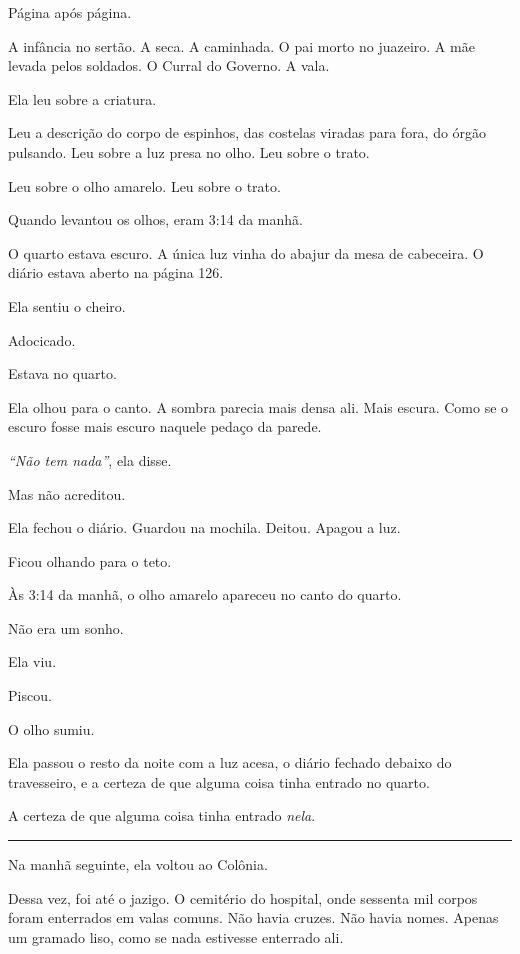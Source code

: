 \noindent Página após página.

\noindent A infância no sertão. A seca. A caminhada. O pai morto no juazeiro. A mãe levada pelos soldados. O Curral do Governo. A vala.

\noindent Ela leu sobre a criatura.

\noindent Leu a descrição do corpo de espinhos, das costelas viradas para fora, do órgão pulsando. Leu sobre a luz presa no olho. Leu sobre o trato.

\noindent Leu sobre o olho amarelo. Leu sobre o trato.

\noindent Quando levantou os olhos, eram 3:14 da manhã.

\noindent O quarto estava escuro. A única luz vinha do abajur da mesa de cabeceira. O diário estava aberto na página 126.

\noindent Ela sentiu o cheiro.

\noindent Adocicado.

\noindent Estava no quarto.

\noindent Ela olhou para o canto. A sombra parecia mais densa ali. Mais escura. Como se o escuro fosse mais escuro naquele pedaço da parede.

\noindent \textit{\textquotedblleft{}Não tem nada\textquotedblright{}}, ela disse.

\noindent Mas não acreditou.

\noindent Ela fechou o diário. Guardou na mochila. Deitou. Apagou a luz.

\noindent Ficou olhando para o teto.

\noindent Às 3:14 da manhã, o olho amarelo apareceu no canto do quarto.

\noindent Não era um sonho.

\noindent Ela viu.

\noindent Piscou.

\noindent O olho sumiu.

\noindent Ela passou o resto da noite com a luz acesa, o diário fechado debaixo do travesseiro, e a certeza de que alguma coisa tinha entrado no quarto.

\noindent A certeza de que alguma coisa tinha entrado \textit{nela}.

\vspace{0.5em}\noindent\rule{\textwidth}{0.5pt}\vspace{0.5em}

\noindent Na manhã seguinte, ela voltou ao Colônia.

\noindent Dessa vez, foi até o jazigo. O cemitério do hospital, onde sessenta mil corpos foram enterrados em valas comuns. Não havia cruzes. Não havia nomes. Apenas um gramado liso, como se nada estivesse enterrado ali.

